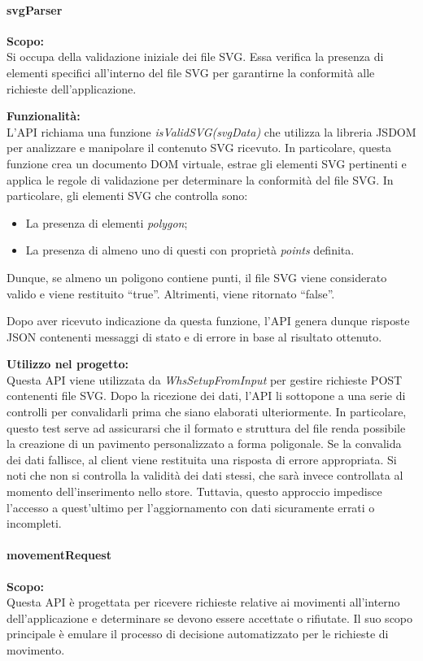 \paragraph{svgParser}
\textbf{Scopo:}\\
Si occupa della validazione iniziale dei file SVG. Essa verifica la presenza di elementi specifici all'interno del file SVG per garantirne la conformità alle richieste dell'applicazione.

\bigskip
\noindent \textbf{Funzionalità:}\\
L'API richiama una funzione \textit{isValidSVG(svgData)} che utilizza la libreria JSDOM per analizzare e manipolare il contenuto SVG ricevuto. In particolare, questa funzione crea un documento DOM virtuale, estrae gli elementi SVG pertinenti e applica le regole di validazione per determinare la conformità del file SVG. In particolare, gli elementi SVG che controlla sono:
\begin{itemize}
    \item La presenza di elementi \textit{polygon};
    \item La presenza di almeno uno di questi con proprietà \textit{points} definita.
\end{itemize}
Dunque, se almeno un poligono contiene punti, il file SVG viene considerato valido e viene restituito ``true''. Altrimenti, viene ritornato ``false''.

\noindent Dopo aver ricevuto indicazione da questa funzione, l'API genera dunque risposte JSON contenenti messaggi di stato e di errore in base al risultato ottenuto.

\bigskip
\noindent \textbf{Utilizzo nel progetto:}\\
Questa API viene utilizzata da \textit{WhsSetupFromInput} per gestire richieste POST contenenti file SVG. Dopo la ricezione dei dati, l'API li sottopone a una serie di controlli per convalidarli prima che siano elaborati ulteriormente. In particolare, questo test serve ad assicurarsi che il formato e struttura del file renda possibile la creazione di un pavimento personalizzato a forma poligonale. Se la convalida dei dati fallisce, al client viene restituita una risposta di errore appropriata. Si noti che non si controlla la validità dei dati stessi, che sarà invece controllata al momento dell'inserimento nello store. Tuttavia, questo approccio impedisce l'accesso a quest'ultimo per l'aggiornamento con dati sicuramente errati o incompleti.

\paragraph{movementRequest}
\textbf{Scopo:}\\
Questa API è progettata per ricevere richieste relative ai movimenti all'interno dell'applicazione e determinare se devono essere accettate o rifiutate. Il suo scopo principale è emulare il processo di decisione automatizzato per le richieste di movimento.

